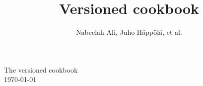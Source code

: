 



\newcommand{\sthnolla}[0]{}

\title{Versioned cookbook}
\author{Nabeelah Ali, Juho H\"{a}pp\"{o}l\"{a}, et al.}





\begin{center}

\vspace{7 cm}
\huge
The versioned cookbook \\
\large
\vspace{1 cm}
\today{}

\vspace{5 cm}

\end{center}

\thispagestyle{empty}

\normalsize

\newpage 

\tableofcontents









